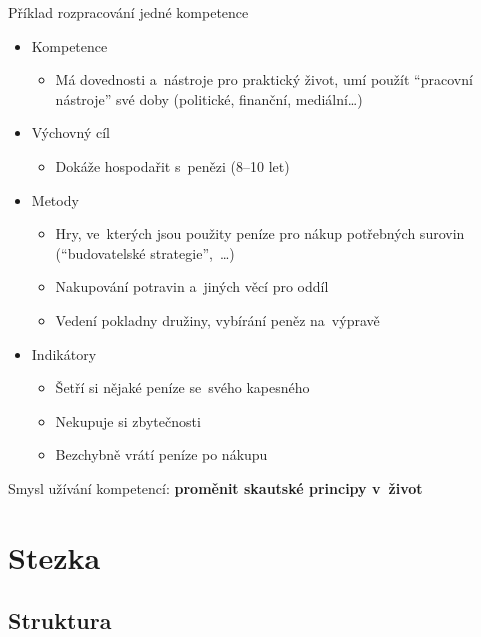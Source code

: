 \documentclass[compress, ucs, xelatex, 11pt, xcolor=dvipsnames, print,
	hyperref={
		bookmarks=true,
		unicode=true,
		colorlinks=true,
		pdftitle={Skautska vychovna metoda},
		plainpages=false,
		pdfauthor={Vojtech Zeisek},
		pdfsubject={Skautska vychovna metoda a jeji vyvoj za posledni stoleti a desetileti},
		pdfcreator={XeLaTeX},
		pdfkeywords={Junak, Pedagogika, Skaut, Skauting, Vychovna metoda},
		linkcolor=Black,
		anchorcolor=Black,
		citecolor=OliveGreen,
		filecolor=OliveGreen,
		menucolor=Black,
		urlcolor=OliveGreen,
		pdftex},
	url={hyphens, lowtilde} %
	]{beamer}
\begin{document}
\begin{frame}{Příklad rozpracování jedné kompetence}
	\begin{itemize}
		\item Kompetence
		\begin{itemize}
			\item Má dovednosti a~nástroje pro praktický život, umí použít \enquote{pracovní nástroje} své doby (politické, finanční, mediální\ldots)
		\end{itemize}
		\item Výchovný cíl
		\begin{itemize}
			\item Dokáže hospodařit s~penězi (8--10 let)
		\end{itemize}
		\item Metody
		\begin{itemize}
			\item Hry, ve~kterých jsou použity peníze pro nákup potřebných surovin (\enquote{budovatelské strategie},~\ldots)
			\item Nakupování potravin a~jiných věcí pro oddíl
			\item Vedení pokladny družiny, vybírání peněz na~výpravě
		\end{itemize}
		\item Indikátory
		\begin{itemize}
			\item Šetří si nějaké peníze se~svého kapesného
			\item Nekupuje si zbytečnosti
			\item Bezchybně vrátí peníze po nákupu
		\end{itemize}
	\end{itemize}
	\alert{Smysl užívání kompetencí: \textbf{proměnit skautské principy v~život}}
\end{frame}

\section{Stezka}

\subsection{Struktura}
\end{document}
